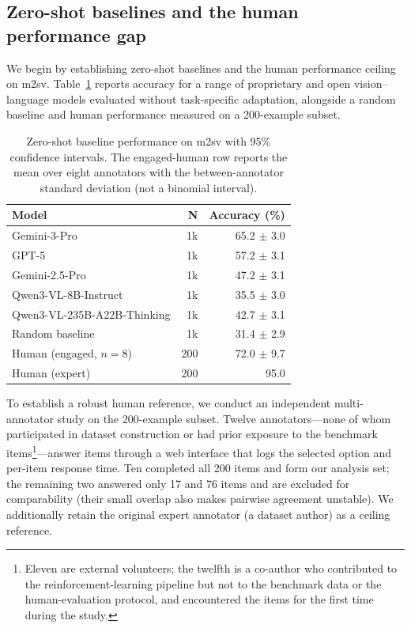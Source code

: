\documentclass{article}
\begin{document}
\subsection{Zero-shot baselines and the human performance gap}
\label{sec:results-zeroshot}

We begin by establishing zero-shot baselines and the human performance ceiling on
m2sv. Table~\ref{tab:m2sv-baselines} reports accuracy for a range of proprietary
and open vision--language models evaluated without task-specific adaptation,
alongside a random baseline and human performance measured on a 200-example
subset.

\begin{table}[t]
  \centering
  \caption{Zero-shot baseline performance on m2sv with 95\% confidence intervals.
  The engaged-human row reports the mean over eight annotators with the
  between-annotator standard deviation (not a binomial interval).}
  \label{tab:m2sv-baselines}
  \begin{tabular}{l r r}
    \toprule
    Model & N & Accuracy (\%) \\
    \midrule
    Gemini-3-Pro & 1k & 65.2 $\pm$ 3.0 \\
    GPT-5 & 1k & 57.2 $\pm$ 3.1 \\
    Gemini-2.5-Pro & 1k & 47.2 $\pm$ 3.1 \\
    \midrule
    Qwen3-VL-8B-Instruct & 1k & 35.5 $\pm$ 3.0 \\
    Qwen3-VL-235B-A22B-Thinking & 1k & 42.7 $\pm$ 3.1 \\
    \midrule
    Random baseline & 1k & 31.4 $\pm$ 2.9 \\
    \midrule
    Human (engaged, $n{=}8$) & 200 & 72.0 $\pm$ 9.7 \\
    Human (expert) & 200 & 95.0 \\
    \bottomrule
  \end{tabular}
\end{table}

To establish a robust human reference, we conduct an independent multi-annotator
study on the 200-example subset. Twelve annotators---none of whom participated in
dataset construction or had prior exposure to the benchmark
items\footnote{Eleven are external volunteers; the twelfth is a co-author who
contributed to the reinforcement-learning pipeline but not to the benchmark data
or the human-evaluation protocol, and encountered the items for the first time
during the study.}---answer items through a web interface that logs the selected
option and per-item response time. Ten completed all 200 items and form our
analysis set; the remaining two answered only 17 and 76 items and are excluded for
comparability (their small overlap also makes pairwise agreement unstable). We
additionally retain the original expert annotator (a dataset author) as a ceiling
reference.
\end{document}
